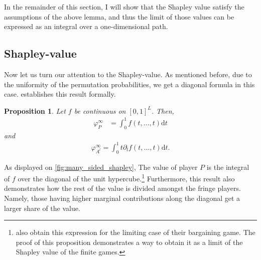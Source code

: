 \documentclass[a4paper]{article}
\newtheorem{proposition}{Proposition}
\newcommand{\dt}{\mathrm{d}t}
\begin{document}
In the remainder of this section, I will show that the Shapley value satisfy the assumptions of the above lemma, and thus the limit of those values can be expressed as an integral over a one-dimensional path.

\subsection{Shapley-value}

Now let us turn our attention to the Shapley-value.
As mentioned before, due to the uniformity of the permutation probabilities, we get a diagonal formula in this case.
 establishes this result formally.

\begin{proposition}
    \label{prop:many_sided_shapley}
    Let $f$ be continuous on $[0, 1]^L$.
    Then,
    \begin{align*}
        \varphi_P^\infty & = \int_0^1 f(t, \dots, t) \dt
    \end{align*}
    and
    \begin{align*}
        \varphi_{A^l}^\infty = \int_0^1 t \partial_l f(t, \dots, t) \dt.
    \end{align*}
\end{proposition}

As displayed on \cref{fig:many_sided_shapley}, The value of player $P$ is the integral of $f$ over the diagonal of the unit hypercube.\footnote{
    \textcite{stole1996intra} also obtain this expression for the limiting case of their bargaining game.
    The proof of this proposition demonstrates a way to obtain it as a limit of the Shapley value of the finite games.
}
Furthermore, this result also demonstrates how the rest of the value is divided amongst the fringe players.
Namely, those having higher marginal contributions along the diagonal get a larger share of the value.
\end{document}

